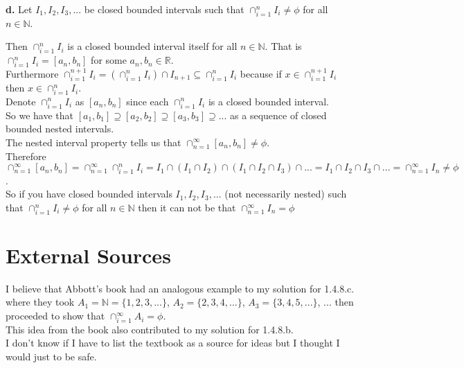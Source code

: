 \documentclass{article}
\begin{document}
{\Large \textbf{d.}} Let $I_1, I_2, I_3, ...$ be closed bounded intervals such that $\cap _{i=1}^n I_i\neq\phi$ for all $n\in\mathbb{N}$.
\begin{center}
    \doublespacing
    Then $\cap _{i=1}^n I_i$ is a closed bounded interval itself for all $n\in\mathbb{N}$. That is $\cap _{i=1}^n I_i = [a_n, b_n]$ for some $a_n, b_n\in\mathbb{R}$.
    \\Furthermore $\cap _{i=1}^{n+1} I_i = (\cap _{i=1}^n I_i)\cap I_{n+1}\subseteq\cap _{i=1}^n I_i$ because if $x\in\cap _{i=1}^{n+1} I_i$ then $x\in\cap _{i=1}^n I_i$.
    \\Denote $\cap _{i=1}^n I_i$ as $[a_n, b_n]$ since each $\cap _{i=1}^n I_i$ is a closed bounded interval.
    \\So we have that $[a_1, b_1]\supseteq [a_2, b_2]\supseteq [a_3, b_3]\supseteq ...$ as a sequence of closed bounded nested intervals.
    \\The nested interval property tells us that $\cap _{n=1}^\infty [a_n, b_n]\neq\phi$.
    \\Therefore $\cap _{n=1}^\infty [a_n, b_n] = \cap _{n=1}^\infty \cap _{i=1}^n I_i = I_1\cap (I_1\cap I_2)\cap (I_1\cap I_2\cap I_3)\cap ... = I_1\cap I_2\cap I_3\cap... = \cap _{n=1}^\infty I_n\neq\phi$.
    \\So if you have closed bounded intervals $I_1, I_2, I_3, ...$ (not necessarily nested) such that $\cap _{i=1}^n I_i\neq\phi$ for all $n\in\mathbb{N}$ then it can not be that $\cap _{n=1}^\infty I_n =\phi$ \qedsymbol
\end{center}

\section*{External Sources}
\doublespacing
\noindent I believe that Abbott's book had an analogous example to my solution for 1.4.8.c. where they took $A_1 =\mathbb{N} = \{1, 2, 3, ...\}$, $A_2 = \{2, 3, 4, ...\}$, $A_3 = \{3, 4, 5, ...\}$, ... then proceeded to show that $\cap _{i=1}^\infty A_i =\phi$.
\\This idea from the book also contributed to my solution for 1.4.8.b.
\\I don't know if I have to list the textbook as a source for ideas but I thought I would just to be safe.
\end{document}
